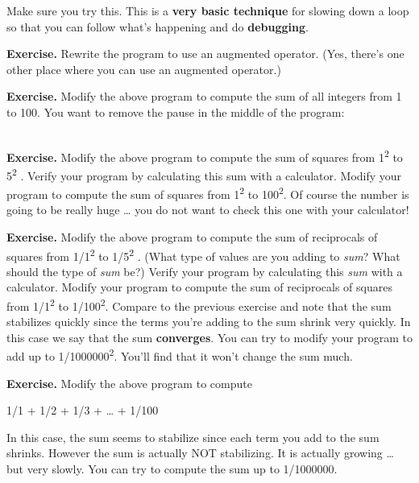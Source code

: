 \documentclass[
]{article}
\begin{document}
\begin{longtable}[]{@{}@{}}
\toprule
\endhead
\bottomrule
\end{longtable}

Make sure you try this. This is a \textbf{very basic technique} for
slowing down a loop so that you can follow what's happening and do
\textbf{debugging}.

\textbf{Exercise.} Rewrite the program to use an augmented operator.
(Yes, there's one other place where you can use an augmented operator.)

\textbf{Exercise.} Modify the above program to compute the sum of all
integers from 1 to 100. You want to remove the pause in the middle of
the program:

\begin{longtable}[]{@{}@{}}
\toprule
\endhead
\bottomrule
\end{longtable}

\textbf{Exercise.} Modify the above program to compute the sum of
squares from 1\textsuperscript{2} to 5\textsuperscript{2 }. Verify your
program by calculating this sum with a calculator. Modify your program
to compute the sum of squares from 1\textsuperscript{2} to
100\textsuperscript{2}. Of course the number is going to be really huge
\ldots{} you do not want to check this one with your calculator!

\textbf{Exercise.} Modify the above program to compute the sum of
reciprocals of squares from 1/1\textsuperscript{2} to
1/5\textsuperscript{2 }. (What type of values are you adding to
\emph{sum}? What should the type of \emph{sum} be?) Verify your program
by calculating this \emph{sum} with a calculator. Modify your program to
compute the sum of reciprocals of squares from 1/1\textsuperscript{2} to
1/100\textsuperscript{2}. Compare to the previous exercise and note that
the sum stabilizes quickly since the terms you're adding to the sum
shrink very quickly. In this case we say that the sum
\textbf{converges}. You can try to modify your program to add up to
1/1000000\textsuperscript{2}. You'll find that it won't change the sum
much.

\textbf{Exercise.} Modify the above program to compute

1/1 + 1/2 + 1/3 + \ldots{} + 1/100

In this case, the sum seems to stabilize since each term you add to the
sum shrinks. However the sum is actually NOT stabilizing. It is actually
growing \ldots{} but very slowly. You can try to compute the sum up to
1/1000000.
\end{document}
